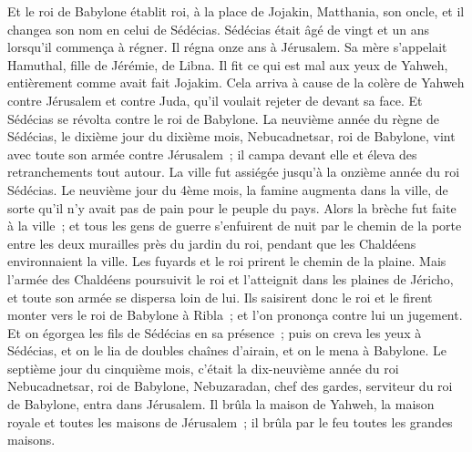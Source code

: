 \begin{multicols}{2}
Et le roi de Babylone établit roi, à la place de Jojakin, Matthania, son oncle, et il changea son nom en celui de Sédécias.
Sédécias était âgé de vingt et un ans lorsqu'il commença à régner. Il régna onze ans à Jérusalem. Sa mère s'appelait Hamuthal, fille de Jérémie, de Libna.
Il fit ce qui est mal aux yeux de Yahweh, entièrement comme avait fait Jojakim.
Cela arriva à cause de la colère de Yahweh contre Jérusalem et contre Juda, qu'il voulait rejeter de devant sa face. Et Sédécias se révolta contre le roi de Babylone.
\VerseOne{}La neuvième année du règne de Sédécias, le dixième jour du dixième mois, Nebucadnetsar, roi de Babylone, vint avec toute son armée contre Jérusalem~; il campa devant elle et éleva des retranchements tout autour.
La ville fut assiégée jusqu'à la onzième année du roi Sédécias.
Le neuvième jour du 4ème mois, la famine augmenta dans la ville, de sorte qu'il n'y avait pas de pain pour le peuple du pays.
Alors la brèche fut faite à la ville~; et tous les gens de guerre s'enfuirent de nuit par le chemin de la porte entre les deux murailles près du jardin du roi, pendant que les Chaldéens environnaient la ville. Les fuyards et le roi prirent le chemin de la plaine.
Mais l'armée des Chaldéens poursuivit le roi et l'atteignit dans les plaines de Jéricho, et toute son armée se dispersa loin de lui.
Ils saisirent donc le roi et le firent monter vers le roi de Babylone à Ribla~; et l'on prononça contre lui un jugement.
Et on égorgea les fils de Sédécias en sa présence~; puis on creva les yeux à Sédécias, et on le lia de doubles chaînes d'airain, et on le mena à Babylone.
Le septième jour du cinquième mois, c'était la dix-neuvième année du roi Nebucadnetsar, roi de Babylone, Nebuzaradan, chef des gardes, serviteur du roi de Babylone, entra dans Jérusalem.
Il brûla la maison de Yahweh, la maison royale et toutes les maisons de Jérusalem~; il brûla par le feu toutes les grandes maisons.

\end{multicols}
